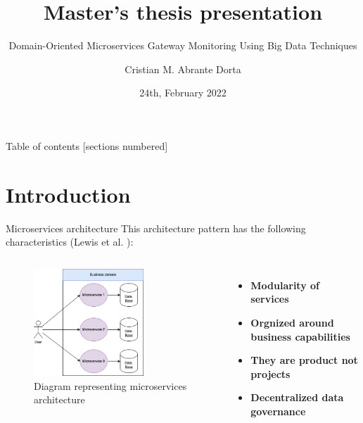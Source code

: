 \documentclass[10pt]{beamer}
\title{Master's thesis presentation}
\subtitle{Domain-Oriented Microservices Gateway Monitoring Using Big Data Techniques}
\date{24th, February 2022}
\author{Cristian M. Abrante Dorta}
\institute{Aalto University \& Unity Technologies}
\begin{document}
\maketitle

\begin{frame}{Table of contents}
  [sections numbered]
  \tableofcontents%
\end{frame}

\section{Introduction}

\begin{frame}{Microservices architecture}
    This architecture pattern has the following characteristics (Lewis et al. \cite{MicroservicesCharacteristics}):

    \begin{columns}
        \begin{figure}
            \centering
            \includegraphics[width=0.7\textwidth]{src/thesis/img/literature-review/microservices.png}
            \caption{Diagram representing microservices architecture}
            \label{fig:my_label}
        \end{figure}
        
        \begin{itemize}
            \item \textbf{Modularity of services}
            \item \textbf{Orgnized around business capabilities}
            \item \textbf{They are product not projects}
            \item \textbf{Decentralized data governance}
        \end{itemize}
    \end{columns}
\end{frame}
\end{document}
